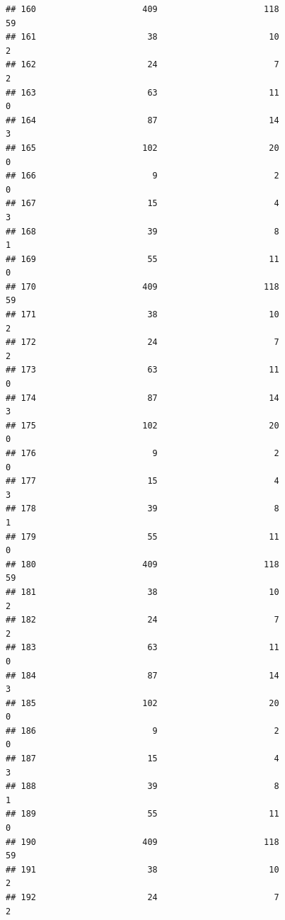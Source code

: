 \documentclass[
]{article}
\begin{document}
\begin{verbatim}
## 160                     409                     118                       59
## 161                      38                      10                        2
## 162                      24                       7                        2
## 163                      63                      11                        0
## 164                      87                      14                        3
## 165                     102                      20                        0
## 166                       9                       2                        0
## 167                      15                       4                        3
## 168                      39                       8                        1
## 169                      55                      11                        0
## 170                     409                     118                       59
## 171                      38                      10                        2
## 172                      24                       7                        2
## 173                      63                      11                        0
## 174                      87                      14                        3
## 175                     102                      20                        0
## 176                       9                       2                        0
## 177                      15                       4                        3
## 178                      39                       8                        1
## 179                      55                      11                        0
## 180                     409                     118                       59
## 181                      38                      10                        2
## 182                      24                       7                        2
## 183                      63                      11                        0
## 184                      87                      14                        3
## 185                     102                      20                        0
## 186                       9                       2                        0
## 187                      15                       4                        3
## 188                      39                       8                        1
## 189                      55                      11                        0
## 190                     409                     118                       59
## 191                      38                      10                        2
## 192                      24                       7                        2

\end{verbatim}
\end{document}
